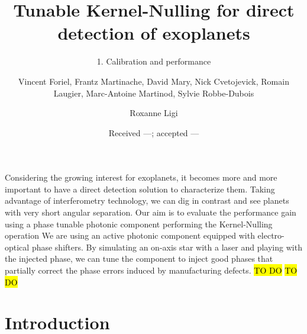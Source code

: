 \documentclass{aa}
\begin{document}
 

   \title{Tunable Kernel-Nulling for direct detection of exoplanets}

   \subtitle{1. Calibration and performance}

   \author{Vincent Foriel,
            Frantz Martinache,
            David Mary,
            Nick Cvetojevick,
            Romain Laugier,
            Marc-Antoine Martinod,
            Sylvie Robbe-Dubois
            \and
            Roxanne Ligi
          }


   \date{Received ---; accepted ---}

     
    \abstract
    {Considering the growing interest for exoplanets, it becomes more and more important to have a direct detection solution to characterize them. Taking advantage of interferometry technology, we can dig in contrast and see planets with very short angular separation.}
    {Our aim is to evaluate the performance gain using a phase tunable photonic component performing the Kernel-Nulling operation}
    {We are using an active photonic component equipped with electro-optical phase shifters. By simulating an on-axis star with a laser and playing with the injected phase, we can tune the component to inject good phases that partially correct the phase errors induced by manufacturing defects.}
    {\hl{TO DO}}
    {\hl{TO DO}}
    
    
    \maketitle
    
    
    \section{Introduction}
    
\end{document}
